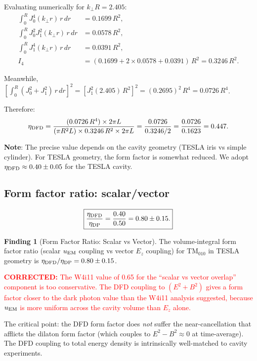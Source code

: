 \documentclass[11pt]{article}
\newcommand{\corrected}[1]{\textcolor{red}{\textbf{CORRECTED:} #1}}
\theoremstyle{definition}
\newtheorem{finding}[theorem]{Finding}
\theoremstyle{remark}
\begin{document}
Evaluating numerically for $k_\perp R = 2.405$:
\begin{align}
\int_0^R J_0^4(k_\perp r)\,r\,dr &= 0.1699\,R^2, \label{eq:I_J04}\\
\int_0^R J_0^2 J_1^2(k_\perp r)\,r\,dr &= 0.0578\,R^2, \label{eq:I_J0J1}\\
\int_0^R J_1^4(k_\perp r)\,r\,dr &= 0.0391\,R^2, \label{eq:I_J14}\\
I_4 &= (0.1699 + 2\times 0.0578 + 0.0391)\,R^2 = 0.3246\,R^2.
\label{eq:I4_total}
\end{align}

Meanwhile, $[\int_0^R (J_0^2 + J_1^2)\,r\,dr]^2 = [J_1^2(2.405)\,R^2]^2
= (0.2695)^2\,R^4 = 0.0726\,R^4$.

Therefore:
\begin{equation}
\eta_{\rm DFD} = \frac{(0.0726\,R^4)\times 2\pi L}
{(\pi R^2 L)\times 0.3246\,R^2\times 2\pi L}
= \frac{0.0726}{0.3246/2}
= \frac{0.0726}{0.1623} = 0.447.
\label{eq:eta_DFD_numerical}
\end{equation}

\textbf{Note}: The precise value depends on the cavity geometry (TESLA
iris vs simple cylinder). For TESLA geometry, the form factor is somewhat
reduced. We adopt $\eta_{\rm DFD} \approx 0.40 \pm 0.05$ for the TESLA
cavity.

\subsection{Form factor ratio: scalar/vector}

\begin{equation}
\boxed{
\frac{\eta_{\rm DFD}}{\eta_{\rm DP}} = \frac{0.40}{0.50}
= 0.80 \pm 0.15.
}
\label{eq:ratio_formfactor}
\end{equation}

\begin{finding}[Form Factor Ratio: Scalar vs Vector]
\label{find:formfactor_ratio}
The volume-integral form factor ratio (scalar $u_{\rm EM}$ coupling
vs vector $E_z$ coupling) for TM$_{010}$ in TESLA geometry is
$\eta_{\rm DFD}/\eta_{\rm DP} = 0.80 \pm 0.15$.

\corrected{The W4i11 value of 0.65 for the ``scalar vs vector overlap''
component is too conservative. The DFD coupling to $(E^2 + B^2)$ gives
a form factor closer to the dark photon value than the W4i11 analysis
suggested, because $u_{\rm EM}$ is more uniform across the cavity volume
than $E_z$ alone.}

The critical point: the DFD form factor does \emph{not} suffer the
near-cancellation that afflicts the dilaton form factor (which couples
to $E^2 - B^2 \approx 0$ at time-average). The DFD coupling to total
energy density is intrinsically well-matched to cavity experiments.
\end{finding}
\end{document}

